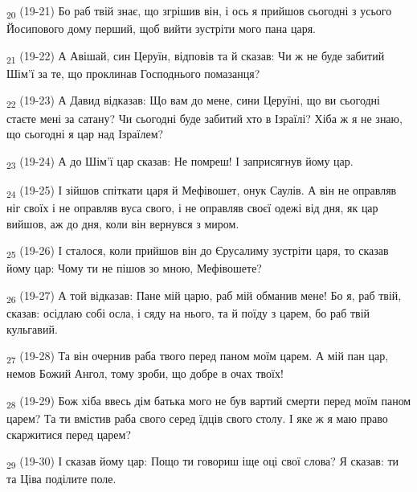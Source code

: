 \begin{tcolorbox}
\textsubscript{20} (19-21) Бо раб твій знає, що згрішив він, і ось я прийшов сьогодні з усього Йосипового дому перший, щоб вийти зустріти мого пана царя.
\end{tcolorbox}
\begin{tcolorbox}
\textsubscript{21} (19-22) А Авішай, син Церуїн, відповів та й сказав: Чи ж не буде забитий Шім'ї за те, що проклинав Господнього помазанця?
\end{tcolorbox}
\begin{tcolorbox}
\textsubscript{22} (19-23) А Давид відказав: Що вам до мене, сини Церуїні, що ви сьогодні стаєте мені за сатану? Чи сьогодні буде забитий хто в Ізраїлі? Хіба ж я не знаю, що сьогодні я цар над Ізраїлем?
\end{tcolorbox}
\begin{tcolorbox}
\textsubscript{23} (19-24) А до Шім'ї цар сказав: Не помреш! І заприсягнув йому цар.
\end{tcolorbox}
\begin{tcolorbox}
\textsubscript{24} (19-25) І зійшов спіткати царя й Мефівошет, онук Саулів. А він не оправляв ніг своїх і не оправляв вуса свого, і не оправляв своєї одежі від дня, як цар вийшов, аж до дня, коли він вернувся з миром.
\end{tcolorbox}
\begin{tcolorbox}
\textsubscript{25} (19-26) І сталося, коли прийшов він до Єрусалиму зустріти царя, то сказав йому цар: Чому ти не пішов зо мною, Мефівошете?
\end{tcolorbox}
\begin{tcolorbox}
\textsubscript{26} (19-27) А той відказав: Пане мій царю, раб мій обманив мене! Бо я, раб твій, сказав: осідлаю собі осла, і сяду на нього, та й поїду з царем, бо раб твій кульгавий.
\end{tcolorbox}
\begin{tcolorbox}
\textsubscript{27} (19-28) Та він очернив раба твого перед паном моїм царем. А мій пан цар, немов Божий Ангол, тому зроби, що добре в очах твоїх!
\end{tcolorbox}
\begin{tcolorbox}
\textsubscript{28} (19-29) Бож хіба ввесь дім батька мого не був вартий смерти перед моїм паном царем? Та ти вмістив раба свого серед їдців свого столу. І яке ж я маю право скаржитися перед царем?
\end{tcolorbox}
\begin{tcolorbox}
\textsubscript{29} (19-30) І сказав йому цар: Пощо ти говориш іще оці свої слова? Я сказав: ти та Ціва поділите поле.
\end{tcolorbox}
